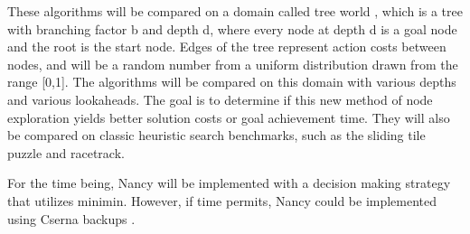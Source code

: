 \documentclass[letterpaper, 11 pt, conference]{ieeeconf}  %
\begin{document}
These algorithms will be compared on a domain called tree world \cite{DBLP:conf/ijcai/Pemberton95}, which is a tree with branching factor b and depth d, where every node at depth d is a goal node and the root is the start node. Edges of the tree represent action costs between nodes, and will be a random number from a uniform distribution drawn from the range [0,1]. The algorithms will be compared on this domain with various depths and various lookaheads. The goal is to determine if this new method of node exploration yields better solution costs or goal achievement time. They will also be compared on classic heuristic search benchmarks, such as the sliding tile puzzle and racetrack.

For the time being, Nancy will be implemented with a decision making strategy that utilizes minimin. However, if time permits, Nancy could be implemented using Cserna backups \cite{DBLP:conf/aips/CsernaRF17}.



\end{document}
